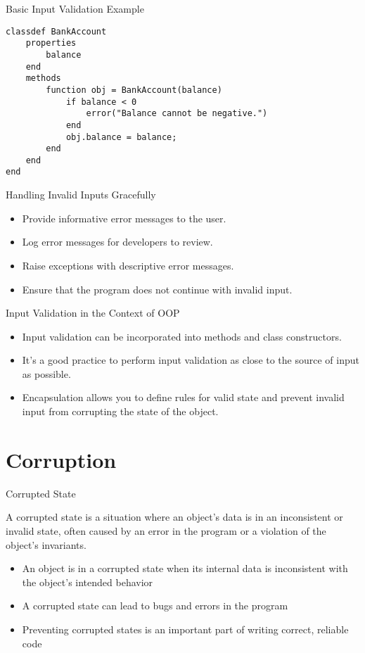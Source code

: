 \documentclass[handout]{beamer}
\begin{document}
\begin{frame}[fragile]{Basic Input Validation Example}
\begin{lstlisting}[style=matlab]
classdef BankAccount
    properties
        balance
    end
    methods
        function obj = BankAccount(balance)
            if balance < 0
                error("Balance cannot be negative.")
            end
            obj.balance = balance;
        end
    end
end
\end{lstlisting}
\end{frame}


\begin{frame}[fragile]{Handling Invalid Inputs Gracefully}
    \begin{itemize}
        \item Provide informative error messages to the user.
        \item Log error messages for developers to review.
        \item Raise exceptions with descriptive error messages.
        \item Ensure that the program does not continue with invalid input.
    \end{itemize}
\end{frame}

\begin{frame}[fragile]{Input Validation in the Context of OOP}
    \begin{itemize}
        \item Input validation can be incorporated into methods and class constructors.
        \item It's a good practice to perform input validation as close to the source of input as possible.
        \item Encapsulation allows you to define rules for valid state and prevent invalid input from corrupting the state of the object.
    \end{itemize}
\end{frame}

\section{Corruption}

\begin{frame}[fragile]{Corrupted State}
    
    A corrupted state is a situation where an object's data is in an inconsistent or invalid state, often caused by an error in the program or a violation of the object's invariants.
    
    \begin{itemize}
        \item An object is in a corrupted state when its internal data is inconsistent with the object's intended behavior
        \item A corrupted state can lead to bugs and errors in the program
        \item Preventing corrupted states is an important part of writing correct, reliable code
    \end{itemize}
    
\end{frame}
\end{document}
